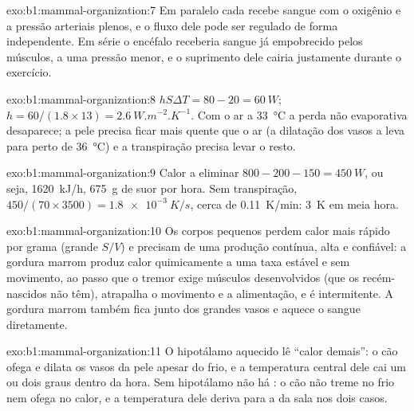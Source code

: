 \begin{solution}{exo:b1:mammal-organization:7}
Em paralelo cada  recebe sangue com o oxigênio e a pressão
arteriais plenos, e o fluxo dele pode ser regulado de forma
independente. Em série o encéfalo receberia sangue já empobrecido pelos
músculos, a uma pressão menor, e o suprimento dele cairia justamente
durante o exercício.
\end{solution}

\begin{solution}{exo:b1:mammal-organization:8}
$hS\Delta T = 80 - 20 = \qty{60}{W}$; $h = 60/(1.8\times 13) =
\qty{2.6}{W.m^{-2}.K^{-1}}$. Com o ar a \qty{33}{\celsius} a perda não
evaporativa desaparece; a pele precisa ficar mais quente que o ar (a
dilatação dos vasos a leva para perto de \qty{36}{\celsius}) e a
transpiração precisa levar o resto.
\end{solution}

\begin{solution}{exo:b1:mammal-organization:9}
Calor a eliminar $800 - 200 - 150 = \qty{450}{W}$, ou seja,
\qty{1620}{kJ/h}, \qty{675}{g} de suor por hora. Sem transpiração,
$450/(70\times 3500) =
\qty{1.8e-3}{K/s}$, cerca de \qty{0.11}{K/min}: \qty{3}{K} em meia hora.
\end{solution}

\begin{solution}{exo:b1:mammal-organization:10}
Os corpos pequenos perdem calor mais rápido por grama (grande $S/V$) e
precisam de uma produção contínua, alta e confiável: a gordura marrom
produz calor quimicamente a uma taxa estável e sem movimento, ao passo
que o tremor exige músculos desenvolvidos (que os recém-nascidos não
têm), atrapalha o movimento e a alimentação, e é intermitente. A gordura
marrom também fica junto dos grandes vasos e aquece o sangue
diretamente.
\end{solution}

\begin{solution}{exo:b1:mammal-organization:11}
O hipotálamo aquecido lê ``calor demais'': o cão ofega e dilata os vasos
da pele apesar do frio, e a temperatura central dele cai um ou dois
graus dentro da hora. Sem hipotálamo não há : o cão
não treme no frio nem ofega no calor, e a temperatura dele deriva para a
da sala nos dois casos.
\end{solution}

